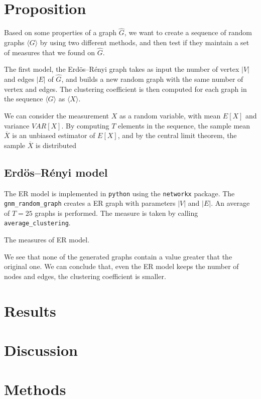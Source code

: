\documentclass[a4paper]{article}
\begin{document}
\section{Proposition}

Based on some properties of a graph $\hat G$, we want to create a sequence of 
random graphs $\langle G \rangle$ by using two different methods, and then test 
if they maintain a set of measures that we found on $\hat G$.

The first model, the Erdös--Rényi graph takes as input the number of vertex 
$|V|$ and edges $|E|$ of $\hat G$, and builds a new random graph with the same 
number of vertex and edges. The clustering coefficient is then computed for each 
graph in the sequence $\langle G \rangle$ as $\langle X \rangle$.

We can consider the measurement $X$ as a random variable, with mean $E[X]$ and 
variance $VAR[X]$. By computing $T$ elements in the sequence, the sample mean 
$\overline X$ is an unbiased estimator of $E[X]$, and by the central limit 
theorem, the sample $\overline X$ is distributed 

\subsection{Erdös--Rényi model}

The ER model is implemented in \texttt{python} using the \texttt{networkx} 
package.  The \texttt{gnm\_random\_graph} creates a ER graph with parameters 
$|V|$ and $|E|$. An average of $T = 25$ graphs is performed. The measure is 
taken by calling \texttt{average\_clustering}.
%
\begin{table}[h]
	\centering
	
	\caption{The measures of ER model.}
	\label{tab:models}
\end{table}
%
We see that none of the generated graphs contain a value greater that the 
original one. We can conclude that, even the ER model keeps the number of nodes 
and edges, the clustering coefficient is smaller.

\section{Results}



\section{Discussion}

\section{Methods}





\end{document}
